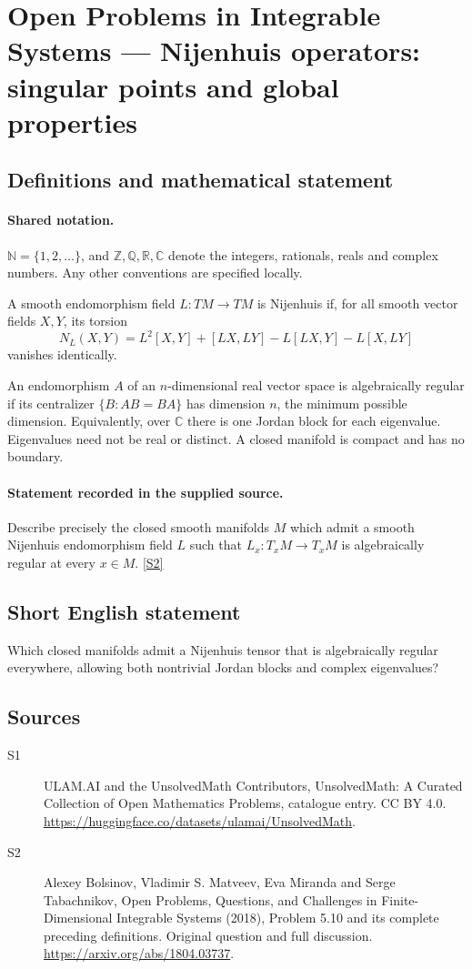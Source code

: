 \documentclass[11pt]{article}
\newcommand{\sref}[2]{\hyperlink{source:#1:#2}{[S#2]}}
\begin{document}
\section{Open Problems in Integrable Systems — Nijenhuis operators: singular points and global properties}\label{statement}

\subsection{Definitions and mathematical statement}

\paragraph{Shared notation.}$\mathbb N=\{1,2,\ldots\}$, and $\mathbb Z,\mathbb Q,\mathbb R,\mathbb C$ denote the integers, rationals, reals and complex numbers. Any other conventions are specified locally.


A smooth endomorphism field $L:TM\to TM$ is Nijenhuis if, for all smooth vector fields $X,Y$, its torsion
\[N_L(X,Y)=L^2[X,Y]+[LX,LY]-L[LX,Y]-L[X,LY]\]
vanishes identically.\par An endomorphism $A$ of an $n$-dimensional real vector space is algebraically regular if its centralizer $\{B:AB=BA\}$ has dimension $n$, the minimum possible dimension. Equivalently, over $\mathbb C$ there is one Jordan block for each eigenvalue. Eigenvalues need not be real or distinct. A closed manifold is compact and has no boundary.
\paragraph{Statement recorded in the supplied source.}
Describe precisely the closed smooth manifolds $M$ which admit a smooth Nijenhuis endomorphism field $L$ such that $L_x:T_xM\to T_xM$ is algebraically regular at every $x\in M$. \sref{statement}{2}
\subsection{Short English statement}
Which closed manifolds admit a Nijenhuis tensor that is algebraically regular everywhere, allowing both nontrivial Jordan blocks and complex eigenvalues?
\subsection{Sources}
\begin{description}
\item[\hypertarget{source:statement:1}{S1}] ULAM.AI and the UnsolvedMath Contributors, UnsolvedMath: A Curated Collection of Open Mathematics Problems, catalogue entry. CC BY 4.0. \url{https://huggingface.co/datasets/ulamai/UnsolvedMath}.
\item[\hypertarget{source:statement:2}{S2}] Alexey Bolsinov, Vladimir S. Matveev, Eva Miranda and Serge Tabachnikov, Open Problems, Questions, and Challenges in Finite-Dimensional Integrable Systems (2018), Problem 5.10 and its complete preceding definitions. Original question and full discussion. \url{https://arxiv.org/abs/1804.03737}.

\end{description}
\label{end:statement}
\end{document}
